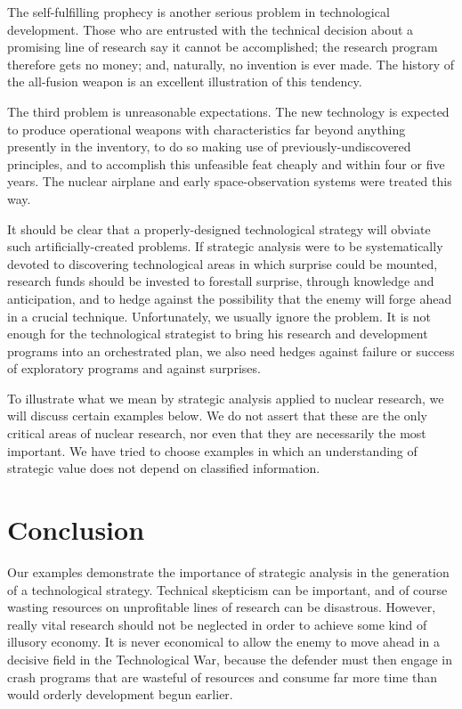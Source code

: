 The self-fulfilling prophecy is another serious problem in technological development. Those who are entrusted with the technical decision about a promising line of research say it cannot be accomplished; the research program therefore gets no money; and, naturally, no invention is ever made. The history of the all-fusion weapon is an excellent illustration of this tendency.

The third problem is unreasonable expectations. The new technology is expected to produce operational weapons with characteristics far beyond anything presently in the inventory, to do so making use of previously-undiscovered principles, and to accomplish this unfeasible feat cheaply and within four or five years. The nuclear airplane and early space-observation systems were treated this way.

It should be clear that a properly-designed technological strategy will obviate such artificially-created problems. If strategic analysis were to be systematically devoted to discovering technological areas in which surprise could be mounted, research funds should be invested to forestall surprise, through knowledge and anticipation, and to hedge against the possibility that the enemy will forge ahead in a crucial technique. Unfortunately, we usually ignore the problem. It is not enough for the technological strategist to bring his research and development programs into an orchestrated plan, we also need hedges against failure or success of exploratory programs and against surprises.

To illustrate what we mean by strategic analysis applied to nuclear research, we will discuss certain examples below. We do not assert that these are the only critical areas of nuclear research, nor even that they are necessarily the most important. We have tried to choose examples in which an understanding of strategic value does not depend on classified information.

\section{Conclusion}
Our examples demonstrate the importance of strategic analysis in the generation of a technological strategy. Technical skepticism can be important, and of course wasting resources on unprofitable lines of research can be disastrous. However, really vital research should not be neglected in order to achieve some kind of illusory economy. It is never economical to allow the enemy to move ahead in a decisive field in the Technological War, because the defender must then engage in crash programs that are wasteful of resources and consume far more time than would orderly development begun earlier.

